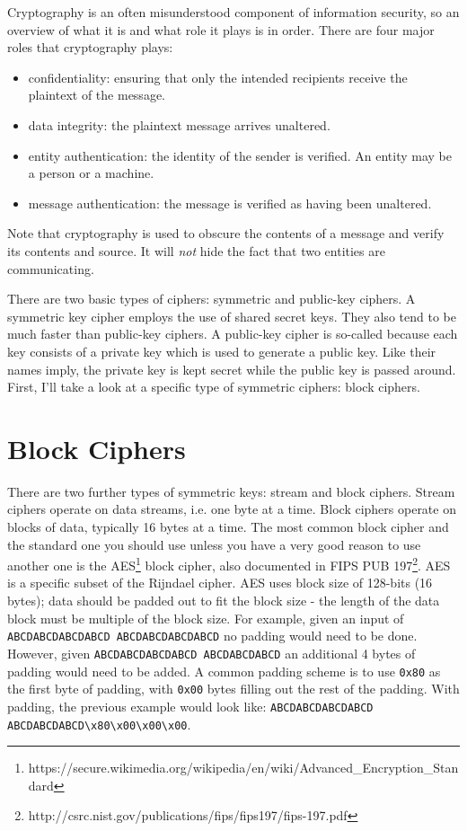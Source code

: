 \documentclass[letterpaper,10pt]{article}
\begin{document}
Cryptography is an often misunderstood component of information
security, so an overview of what it is and what role it plays is in
order. There are four major roles that cryptography plays:

\begin{itemize}

  \item confidentiality: ensuring that only the intended recipients
  receive the plaintext of the message.

  \item data integrity: the plaintext message arrives unaltered.

  \item entity authentication: the identity of the sender is verified.
  An entity may be a person or a machine.

  \item message authentication: the message is verified as having
  been unaltered.

\end{itemize}

Note that cryptography is used to obscure the contents of a message and
verify its contents and source. It will \emph{not} hide the fact that two
entities are communicating.

There are two basic types of ciphers: symmetric and public-key ciphers.
A symmetric key cipher employs the use of shared secret keys. They also
tend to be much faster than public-key ciphers. A public-key cipher is
so-called because each key consists of a private key which is used to
generate a public key. Like their names imply, the private key is kept
secret while the public key is passed around. First, I’ll take a look at
a specific type of symmetric ciphers: block ciphers.


\section{Block Ciphers}
There are two further types of symmetric keys: stream and block
ciphers.  Stream ciphers operate on data streams, i.e. one byte at
a time. Block ciphers operate on blocks of data, typically 16 bytes
at a time. The most common block cipher and the standard one you
should use unless you have a very good reason to use another one
is the
AES\footnote{https://secure.wikimedia.org/wikipedia/en/wiki/Advanced\_Encryption\_Standard}
block cipher, also documented in FIPS PUB
197\footnote{http://csrc.nist.gov/publications/fips/fips197/fips-197.pdf}.
AES is a specific subset of the Rijndael cipher. AES uses block
size of 128-bits (16 bytes); data should be padded out to fit the
block size - the length of the data block must be multiple of the
block size. For example, given an input of \verb|ABCDABCDABCDABCD ABCDABCDABCDABCD|
no padding would need to be done.  However, given
\verb|ABCDABCDABCDABCD ABCDABCDABCD| an additional 4 bytes of padding
would need to be added. A common padding scheme is to use \verb|0x80|
as the first byte of padding, with \verb|0x00| bytes filling out the
rest of the padding.  With padding, the previous example would look
like: \verb|ABCDABCDABCDABCD| \verb|ABCDABCDABCD\x80\x00\x00\x00|.
\end{document}
